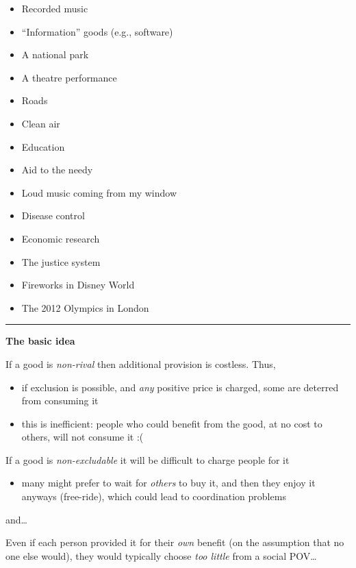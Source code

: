 \documentclass[]{article}
\providecommand{\tightlist}{%
  \setlength{\itemsep}{0pt}\setlength{\parskip}{0pt}}
\begin{document}
\begin{itemize}
\tightlist
\item
  Recorded music
\item
  ``Information'' goods (e.g., software)
\item
  A national park
\item
  A theatre performance
\item
  Roads
\item
  Clean air
\item
  Education
\item
  Aid to the needy
\item
  Loud music coming from my window
\item
  Disease control
\item
  Economic research
\item
  The justice system
\item
  Fireworks in Disney World
\item
  The 2012 Olympics in London
\end{itemize}

\begin{center}\rule{0.5\linewidth}{\linethickness}\end{center}

\textbf{The basic idea}

If a good is \emph{non-rival} then additional provision is costless.
Thus,

\begin{itemize}
\tightlist
\item
  if exclusion is possible, and \emph{any} positive price is charged, some are deterred from consuming it
\item
  this is inefficient: people who could benefit from the good, at no cost to others, will not consume it :(
\end{itemize}

If a good is \emph{non-excludable} it will be difficult to charge people for it

\begin{itemize}
\tightlist
\item
  many might prefer to wait for \emph{others} to buy it, and then they enjoy it anyways (free-ride), which could lead to coordination problems
\end{itemize}

and\ldots{}

\bigskip

Even if each person provided it for their \emph{own} benefit (on the assumption that no one else would), they would typically choose \emph{too little} from a social POV\ldots{}
\end{document}

